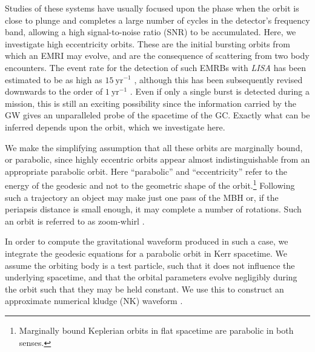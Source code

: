 \documentclass[useAMS,usedcolumn,usegraphicx,usenatbib]{mn2e}
\newcommand{\units}[1]{\ensuremath{~\mathrm{#1}}}
\begin{document}
Studies of these systems have usually focused upon the phase when the orbit is close to plunge and completes a large number of cycles in the detector's frequency band, allowing a high signal-to-noise ratio (SNR) to be accumulated. Here, we investigate high eccentricity orbits. These are the initial bursting orbits from which an EMRI may evolve, and are the consequence of scattering from two body encounters. The event rate for the detection of such EMRBs with \textit{LISA} has been estimated to be as high as $15\units{yr^{-1}}$ \citep{Rubbo2006}, although this has been subsequently revised downwards to the order of $1\units{yr^{-1}}$ \citep*{Hopman2007}. Even if only a single burst is detected during a mission, this is still an exciting possibility since the information carried by the GW gives an unparalleled probe of the spacetime of the GC. Exactly what can be inferred depends upon the orbit, which we investigate here. 

We make the simplifying assumption that all these orbits are marginally bound, or parabolic, since highly eccentric orbits appear almost indistinguishable from an appropriate parabolic orbit. Here ``parabolic'' and ``eccentricity'' refer to the energy of the geodesic and not to the geometric shape of the orbit.\footnote{Marginally bound Keplerian orbits in flat spacetime are parabolic in both senses.} Following such a trajectory an object may make just one pass of the MBH or, if the periapsis distance is small enough, it may complete a number of rotations. Such an orbit is referred to as zoom-whirl \citep{Glampedakis2002a}.

In order to compute the gravitational waveform produced in such a case, we integrate the geodesic equations for a parabolic orbit in Kerr spacetime. We assume the orbiting body is a test particle, such that it does not influence the underlying spacetime, and that the orbital parameters evolve negligibly during the orbit such that they may be held constant. We use this to construct an approximate numerical kludge (NK) waveform \citep{Babak2007}.
\end{document}
